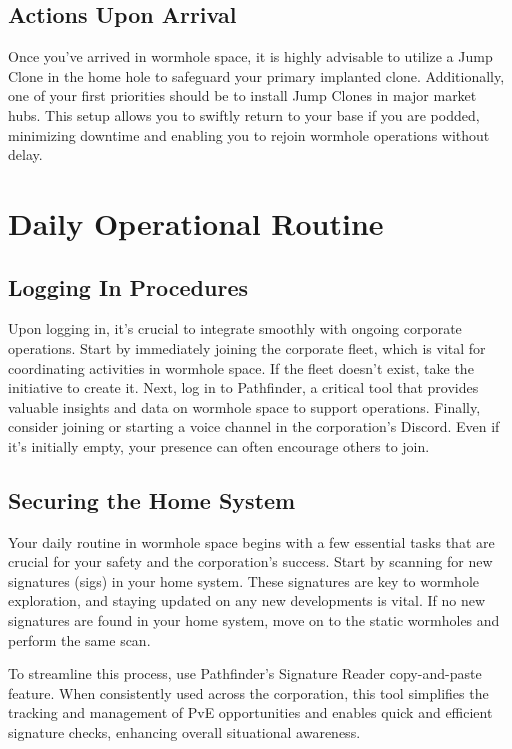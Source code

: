 \documentclass[a4paper,12pt]{report}
\begin{document}
\section{Actions Upon Arrival}

Once you’ve arrived in wormhole space, it is highly advisable to utilize a Jump Clone in the home hole to safeguard your primary implanted clone. Additionally, one of your first priorities should be to install Jump Clones in major market hubs. This setup allows you to swiftly return to your base if you are podded, minimizing downtime and enabling you to rejoin wormhole operations without delay.

\chapter{Daily Operational Routine}

\section{Logging In Procedures}

Upon logging in, it’s crucial to integrate smoothly with ongoing corporate operations. Start by immediately joining the corporate fleet, which is vital for coordinating activities in wormhole space. If the fleet doesn’t exist, take the initiative to create it. Next, log in to Pathfinder, a critical tool that provides valuable insights and data on wormhole space to support operations. Finally, consider joining or starting a voice channel in the corporation’s Discord. Even if it’s initially empty, your presence can often encourage others to join.

\section{Securing the Home System}

Your daily routine in wormhole space begins with a few essential tasks that are crucial for your safety and the corporation’s success. Start by scanning for new signatures (sigs) in your home system. These signatures are key to wormhole exploration, and staying updated on any new developments is vital. If no new signatures are found in your home system, move on to the static wormholes and perform the same scan.

To streamline this process, use Pathfinder’s Signature Reader copy-and-paste feature. When consistently used across the corporation, this tool simplifies the tracking and management of PvE opportunities and enables quick and efficient signature checks, enhancing overall situational awareness.
\end{document}
